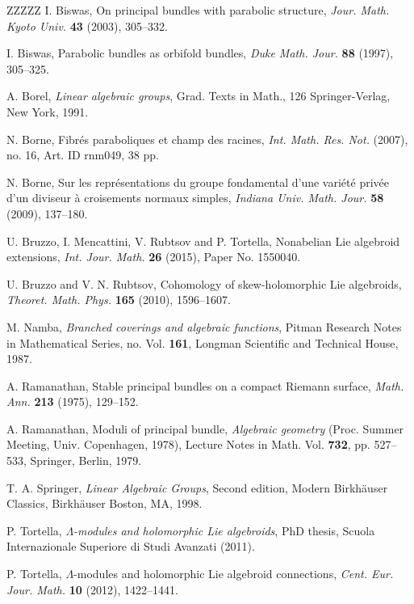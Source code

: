 \documentclass[12pt, reqno]{amsart}
\numberwithin{equation}{section}
\begin{document}
\begin{thebibliography}{ZZZZZ}
 I. Biswas, On principal bundles with parabolic structure, {\it Jour. Math. Kyoto Univ.}
{\bf 43} (2003), 305--332.

 I. Biswas, Parabolic bundles as orbifold bundles, {\it Duke Math. Jour.}
{\bf 88} (1997), 305--325.

 A. Borel, {\it Linear algebraic groups}, Grad. Texts in Math., 126
Springer-Verlag, New York, 1991.

 N. Borne, Fibr\'es paraboliques et champ des racines,
{\it Int. Math. Res. Not.} (2007), no. 16, Art. ID rnm049, 38 pp.

 N. Borne, Sur les repr\'esentations du groupe fondamental d'une
vari\'et\'e priv\'ee d'un diviseur \`a croisements normaux simples,
{\it Indiana Univ. Math. Jour.} {\bf 58} (2009), 137--180.

 U. Bruzzo, I. Mencattini, V. Rubtsov and P. Tortella, Nonabelian Lie algebroid extensions,
{\it Int. Jour. Math.} {\bf 26} (2015), Paper No. 1550040.

 U. Bruzzo and V. N. Rubtsov, Cohomology of skew-holomorphic Lie algebroids, {\it Theoret. Math.
Phys.} {\bf 165} (2010), 1596--1607.

 M. Namba, {\it Branched coverings and algebraic functions}, Pitman Research Notes in Mathematical
Series, no. Vol. {\bf 161}, Longman Scientific and Technical House, 1987.

 A. Ramanathan, Stable principal bundles on a compact Riemann surface, {\it Math. Ann.}
{\bf 213} (1975), 129--152.

 A. Ramanathan, Moduli of principal bundle, {\it Algebraic geometry} (Proc. Summer
Meeting, Univ. Copenhagen, 1978), Lecture Notes in Math. Vol. {\bf 732}, pp. 527--533, 
Springer, Berlin, 1979.

 T. A. Springer, \textit{Linear Algebraic Groups}, Second edition,
Modern Birkh\"auser Classics, Birkh\"auser Boston, MA, 1998.

 P. Tortella, {\it $\Lambda$-modules and holomorphic Lie algebroids}, PhD thesis, Scuola 
Internazionale Superiore di Studi Avanzati (2011).

 P. Tortella, $\Lambda$-modules and holomorphic Lie algebroid connections, {\it Cent.
Eur. Jour. Math.} {\bf 10} (2012), 1422--1441.

\end{thebibliography}
\end{document}
